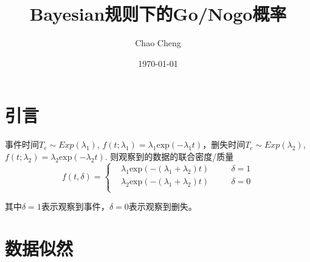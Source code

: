 \documentclass[a4paper,12pt]{article}
\title{Bayesian规则下的Go/Nogo概率}
\author{Chao Cheng}
\date{\today}
\begin{document}
\maketitle
\tableofcontents{}

\section{引言}
\label{sec:introduction}

事件时间$T_e\sim Exp(\lambda_1)$, $f(t;\lambda_1) = \lambda_1 \mathrm{exp}\left(-\lambda_1 t\right)$，删失时间$T_c \sim Exp(\lambda_2)$, $f\left(t;\lambda_2\right) = \lambda_2 \mathrm{exp}\left(-\lambda_2t\right)$. 则观察到的数据的联合密度/质量
\begin{equation}
  \label{eq:joint_density}
    f\left(t, \delta\right) = \left\{
    \begin{aligned}
      &\lambda_1\mathrm{exp}\left(-(\lambda_1 + \lambda_2)t\right) && \quad \delta = 1    \\
      &\lambda_2\mathrm{exp}\left(-(\lambda_1 + \lambda_2)t\right) && \quad \delta = 0    \\
    \end{aligned}
  \right.
\end{equation}

其中$\delta = 1$表示观察到事件，$\delta = 0$表示观察到删失。

\section{数据似然}
\label{sec:data_likelihood}
\end{document}
